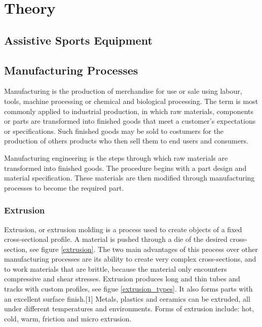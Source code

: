 \chapter{Theory}

\section{Assistive Sports Equipment}

\section{Manufacturing Processes}
Manufacturing is the production of merchandise for use or sale using labour, tools, machine processing or chemical and biological processing. The term is most commonly applied to industrial production, in which raw materials, components or parts are transformed into finished goods that meet a customer's expectations or specifications. \cite{manufacturing} Such finished goods may be sold to costumers for the production of others products who then sell them to end users and consumers.
\par
Manufacturing engineering is the steps through which raw materials are transformed into finished goods. The procedure begins with a part design and material specification. These materials are then modified through manufacturing processes to become the required part.

\subsection{Extrusion}
Extrusion, or extrusion molding is a process used to create objects of a fixed cross-sectional profile. A material is pushed through a die of the desired cross-section, see figure \ref{extrusion}. The two main advantages of this process over other manufacturing processes are its ability to create very complex cross-sections, and to work materials that are brittle, because the material only encounters compressive and shear stresses. Extrusion produces long and thin tubes and tracks with custom profiles, see figue \ref{extrusion_types}. It also forms parts with an excellent surface finish.[1] Metals, plastics and ceramics can be extruded, all under different temperatures and environments. Forms of extrusion include: hot, cold, warm, friction and micro extrusion.

